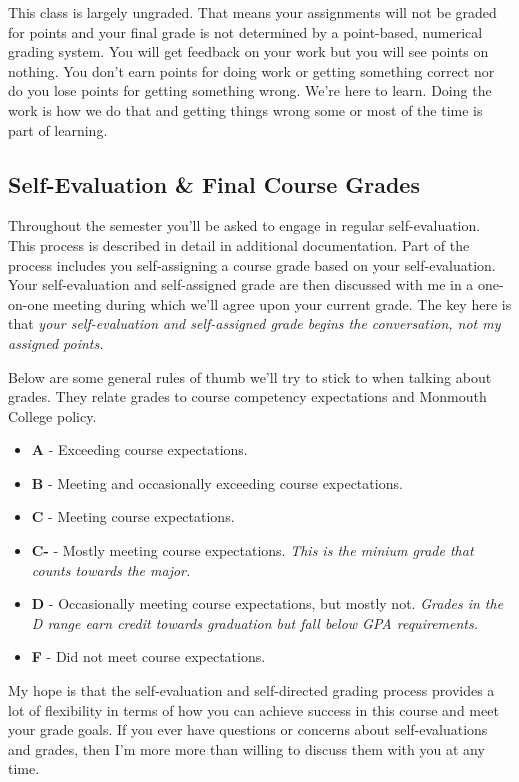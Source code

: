 \documentclass[10pt]{article}
\begin{document}
This class is largely ungraded. That means your assignments will not be graded for points and your final grade is not determined by a point-based, numerical grading system. You will get feedback on your work but you will see points on nothing. You don't earn points for doing work or getting something correct nor do you lose points for getting something wrong. We're here to learn. Doing the work is how we do that and getting things wrong some or most of the time is part of learning.

\subsection{Self-Evaluation \& Final Course Grades}

Throughout the semester you'll be asked to engage in regular self-evaluation. This process is described in detail in additional documentation. Part of the process includes you self-assigning a course grade based on your self-evaluation. Your self-evaluation and self-assigned grade are then discussed with me in a one-on-one meeting during which we'll agree upon your current grade. The key here is that \textit{your self-evaluation and self-assigned grade begins the conversation, not my assigned points.}

Below are some general rules of thumb we'll try to stick to when talking about grades. They relate grades to course competency expectations and Monmouth College policy.
\begin{itemize}
  \item \textbf{A} - Exceeding course expectations.
  \item \textbf{B} - Meeting and occasionally exceeding course expectations.
  \item \textbf{C} - Meeting course expectations.
  \item \textbf{C-} - Mostly meeting course expectations. \textit{This is the minium grade that counts towards the major.}
  \item \textbf{D} - Occasionally meeting course expectations, but mostly not. \textit{Grades in the D range earn credit towards graduation but fall below GPA requirements.}
  \item \textbf{F} - Did not meet course expectations.
\end{itemize}

My hope is that the self-evaluation and self-directed grading process provides a lot of flexibility in terms of how you can achieve success in this course and meet your grade goals. If you ever have questions or concerns about self-evaluations and grades, then I'm more more than willing to discuss them with you at any time.
\end{document}
